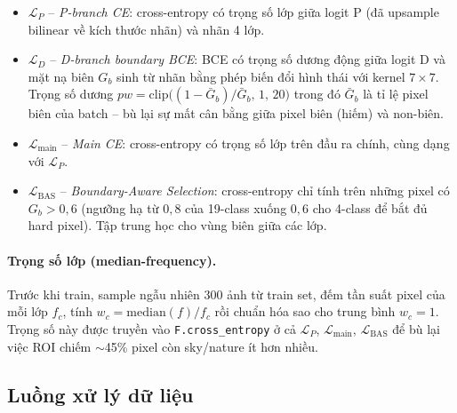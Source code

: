 \begin{itemize}
  \item $\mathcal{L}_{P}$ -- \textit{P-branch CE}: cross-entropy có trọng số lớp giữa logit P (đã upsample bilinear về kích thước nhãn) và nhãn 4 lớp.
  \item $\mathcal{L}_{D}$ -- \textit{D-branch boundary BCE}: BCE có trọng số dương động giữa logit D và mặt nạ biên $G_b$ sinh từ nhãn bằng phép biến đổi hình thái với kernel $7\times7$. Trọng số dương $pw = \mathrm{clip}\bigl((1 - \bar{G}_b)/\bar{G}_b,\,1,\,20\bigr)$ trong đó $\bar{G}_b$ là tỉ lệ pixel biên của batch -- bù lại sự mất cân bằng giữa pixel biên (hiếm) và non-biên.
  \item $\mathcal{L}_{\text{main}}$ -- \textit{Main CE}: cross-entropy có trọng số lớp trên đầu ra chính, cùng dạng với $\mathcal{L}_{P}$.
  \item $\mathcal{L}_{\text{BAS}}$ -- \textit{Boundary-Aware Selection}: cross-entropy chỉ tính trên những pixel có $G_b > 0{,}6$ (ngưỡng hạ từ $0{,}8$ của 19-class xuống $0{,}6$ cho 4-class để bắt đủ hard pixel). Tập trung học cho vùng biên giữa các lớp.
\end{itemize}

\paragraph{Trọng số lớp (median-frequency).} Trước khi train, sample ngẫu nhiên 300 ảnh từ train set, đếm tần suất pixel của mỗi lớp $f_c$, tính
$w_c = \mathrm{median}(f)/f_c$ rồi chuẩn hóa sao cho trung bình $w_c = 1$. Trọng số này được truyền vào \texttt{F.cross\_entropy} ở cả $\mathcal{L}_P$, $\mathcal{L}_{\text{main}}$, $\mathcal{L}_{\text{BAS}}$ để bù lại việc ROI chiếm $\sim$45\% pixel còn sky/nature ít hơn nhiều.




\subsection{Luồng xử lý dữ liệu}
\label{subsec:luong-xu-ly}
 
